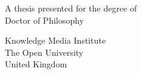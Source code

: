 \begin{titlepage}
    \begin{center}
        \vspace*{1cm}
            
        \Huge
        \textbf{\thetitle}
            
        \vspace{0.5cm}
        \LARGE
        \makeatletter \@subtitle \makeatother %
            
        \vspace{1.5cm}
            
        \textbf{\theauthor}
            
        \vfill
            
        A thesis presented for the degree of\\
        Doctor of Philosophy
            
        \vspace{0.8cm}
            
        
        \centering
        \usebox{\largestimage}
        \hfill
        
        \vspace{0.8cm}
            
        \Large
        Knowledge Media Institute\\
        The Open University\\
        United Kingdom\\
        \thedate
            
    \end{center}
\end{titlepage}